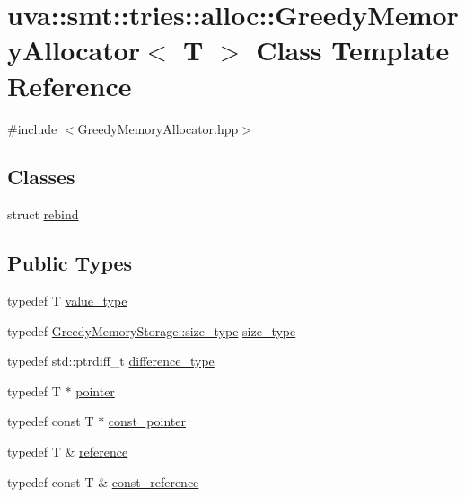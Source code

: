 \hypertarget{classuva_1_1smt_1_1tries_1_1alloc_1_1_greedy_memory_allocator}{}\section{uva\+:\+:smt\+:\+:tries\+:\+:alloc\+:\+:Greedy\+Memory\+Allocator$<$ T $>$ Class Template Reference}
\label{classuva_1_1smt_1_1tries_1_1alloc_1_1_greedy_memory_allocator}


{\ttfamily \#include $<$Greedy\+Memory\+Allocator.\+hpp$>$}

\subsection*{Classes}
\begin{DoxyCompactItemize}
\item 
struct \hyperlink{structuva_1_1smt_1_1tries_1_1alloc_1_1_greedy_memory_allocator_1_1rebind}{rebind}
\end{DoxyCompactItemize}
\subsection*{Public Types}
\begin{DoxyCompactItemize}
\item 
typedef T \hyperlink{classuva_1_1smt_1_1tries_1_1alloc_1_1_greedy_memory_allocator_a11ff94e5a9e23e3db57976661f6d06f8}{value\+\_\+type}
\item 
typedef \hyperlink{classuva_1_1smt_1_1tries_1_1alloc_1_1_greedy_memory_storage_a15b9139bffa854a165a11131725fa903}{Greedy\+Memory\+Storage\+::size\+\_\+type} \hyperlink{classuva_1_1smt_1_1tries_1_1alloc_1_1_greedy_memory_allocator_a76d81ff5df20ef0404bb2027016b8b2d}{size\+\_\+type}
\item 
typedef std\+::ptrdiff\+\_\+t \hyperlink{classuva_1_1smt_1_1tries_1_1alloc_1_1_greedy_memory_allocator_a14467f640838b0667457750468f433cc}{difference\+\_\+type}
\item 
typedef T $\ast$ \hyperlink{classuva_1_1smt_1_1tries_1_1alloc_1_1_greedy_memory_allocator_ad82be226faea1278f210654317249483}{pointer}
\item 
typedef const T $\ast$ \hyperlink{classuva_1_1smt_1_1tries_1_1alloc_1_1_greedy_memory_allocator_aaa55b155c72c0817936b86c9c11a6ab2}{const\+\_\+pointer}
\item 
typedef T \& \hyperlink{classuva_1_1smt_1_1tries_1_1alloc_1_1_greedy_memory_allocator_a62f7001b75a49f4711f5b06900642f8b}{reference}
\item 
typedef const T \& \hyperlink{classuva_1_1smt_1_1tries_1_1alloc_1_1_greedy_memory_allocator_a1f74969c0895bf669864b2b28e675386}{const\+\_\+reference}
\end{DoxyCompactItemize}
